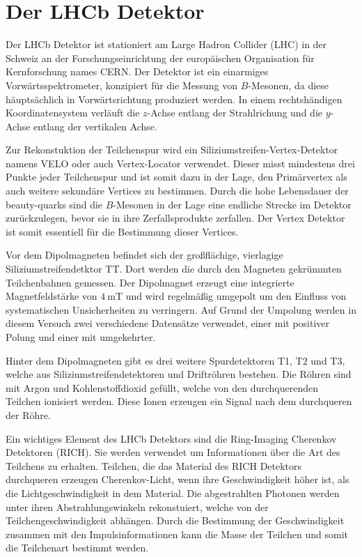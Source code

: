 \section{Der LHCb Detektor}
\label{sec:lhcb}

Der LHCb Detektor \cite{lhcb} ist stationiert am Large Hadron Collider (LHC) in 
der Schweiz an der Forschungseinrichtung der europäischen 
Organisation für Kernforschung names CERN. Der Detektor ist ein einarmiges 
Vorwärtsspektrometer, konzipiert für die Messung von $B$-Mesonen, da diese 
häuptsächlich in Vorwärtsrichtung produziert werden. In einem rechtshändigen 
Koordinatensystem verläuft die $z$-Achse entlang der Strahlrichung und die 
$y$-Achse entlang der vertikalen Achse. \par 

Zur Rekonstuktion der Teilchenspur wird ein Siliziumstreifen-Vertex-Detektor 
namens VELO oder auch Vertex-Locator verwendet. Dieser misst mindestens drei 
Punkte jeder Teilchenspur und ist somit dazu in der Lage, den Primärvertex als 
auch weitere sekundäre Vertices zu bestimmen. Durch die hohe Lebensdauer der beauty-quarks 
sind die $B$-Mesonen in der Lage eine endliche Strecke im Detektor zurückzulegen,
bevor sie in ihre Zerfallsprodukte zerfallen. Der Vertex Detektor ist somit 
essentiell für die Bestimmung dieser Vertices. \par
Vor dem Dipolmagneten befindet sich 
der großflächige, vierlagige Siliziumstreifendetktor TT. Dort werden die durch den 
Magneten gekrümmten Teilchenbahnen gemessen. Der Dipolmagnet erzeugt eine 
integrierte Magnetfeldstärke von $\SI{4}{\milli\tesla}$ und wird regelmäßig 
umgepolt um den Einfluss von systematischen Unsicherheiten zu verringern. Auf Grund 
der Umpolung werden in diesem Versuch zwei verschiedene Datensätze verwendet, einer 
mit positiver Polung und einer mit umgekehrter. \par 
Hinter dem Dipolmagneten gibt es drei weitere Spurdetektoren T1, T2 und T3, welche 
aus Siliziumstreifendetektoren und Driftröhren bestehen. Die Röhren sind mit 
Argon und Kohlenstoffdioxid gefüllt, welche von den durchquerenden Teilchen 
ionisiert werden. Diese Ionen erzeugen ein Signal nach dem durchqueren der Röhre. \par 

Ein wichtiges Element des LHCb Detektors sind die Ring-Imaging Cherenkov Detektoren (RICH). 
Sie werden verwendet um Informationen über die Art des Teilchens zu erhalten. Teilchen,
die das Material des RICH Detektors durchqueren erzeugen Cherenkov-Licht, wenn 
ihre Geschwindigkeit höher ist, als die Lichtgeschwindigkeit in dem Material. Die 
abgestrahlten Photonen werden unter ihren Abstrahlungswinkeln rekonstuiert, welche 
von der Teilchengeschwindigkeit abhängen. Durch die Bestimmung der Geschwindigkeit 
zusammen mit den Impulsinformationen kann die Masse der Teilchen und somit die 
Teilchenart bestimmt werden.\par 

